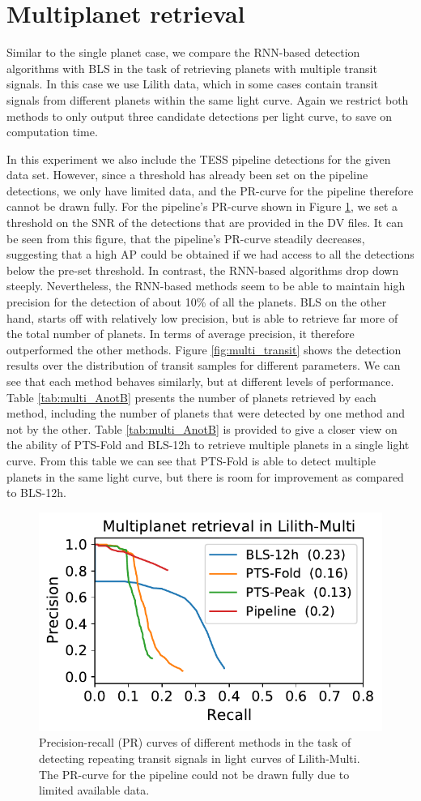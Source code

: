 \section{Multiplanet retrieval}
\label{sec:multis}

Similar to the single planet case, we compare the RNN-based detection algorithms with BLS in the task of retrieving planets with multiple transit signals. In this case we use Lilith data, which in some cases contain transit signals from different planets within the same light curve. Again we restrict both methods to only output three candidate detections per light curve, to save on computation time.

In this experiment we also include the TESS pipeline detections for the given data set. However, since a threshold has already been set on the pipeline detections, we only have limited data, and the PR-curve for the pipeline therefore cannot be drawn fully. For the pipeline's PR-curve shown in Figure \ref{fig:multi_pr}, we set a threshold on the SNR of the detections that are provided in the DV files. It can be seen from this figure, that the pipeline's PR-curve steadily decreases, suggesting that a high AP could be obtained if we had access to all the detections below the pre-set threshold. In contrast, the RNN-based algorithms drop down steeply. Nevertheless, the RNN-based methods seem to be able to maintain high precision for the detection of about 10\% of all the planets. BLS on the other hand, starts off with relatively low precision, but is able to retrieve far more of the total number of planets. In terms of average precision, it therefore outperformed the other methods. Figure \ref{fig:multi_transit} shows the detection results over the distribution of transit samples for different parameters. We can see that each method behaves similarly, but at different levels of performance. Table \ref{tab:multi_AnotB} presents the number of planets retrieved by each method, including the number of planets that were detected by one method and not by the other. Table \ref{tab:multi_AnotB} is provided to give a closer view on the ability of PTS-Fold and BLS-12h to retrieve multiple planets in a single light curve. From this table we can see that PTS-Fold is able to detect multiple planets in the same light curve, but there is room for improvement as compared to BLS-12h.

\begin{figure}
    \centering
    \includegraphics[width=0.35\linewidth]{Experiments/Figures/Multis/multi_pr.pdf}
    \caption{Precision-recall (PR) curves of different methods in the task of detecting repeating transit signals in light curves of Lilith-Multi. The PR-curve for the pipeline could not be drawn fully due to limited available data.}
    \label{fig:multi_pr}
\end{figure}

